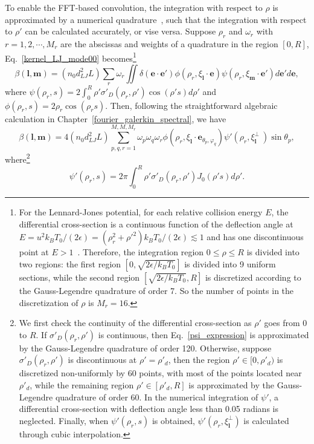 To enable the FFT-based convolution, the integration with respect to $\rho$ is approximated by a numerical quadrature~\cite{Hu2012,wuPoF2015}, such that the integration with respect to $\rho'$ can be calculated accurately, or vise versa. Suppose $\rho_r$ and $\omega_r$ with $r=1,2,\cdots,M_r$ are the abscissas and weights of a quadrature in the region $[0,R]$, Eq.~\eqref{kernel_LJ_mode00} becomes\footnote{For the Lennard-Jones potential, for each relative collision energy $E$, the differential cross-section is a continuous function of the deflection angle at $E=u^2k_BT_0/(2\epsilon)=(\rho_r^2+\rho'^2)k_BT_0/(2\epsilon)\lesssim1$ and has one discontinuous point at $E>1$~\cite{Sharipov_trans}. Therefore, the integration region $0\le\rho\le{}R$ is divided into two regions: the first region $[0,\sqrt{2\epsilon/k_BT_0}]$ is divided into 9 uniform sections, while the second region $[\sqrt{2\epsilon/k_BT_0},R]$ is discretized according to the Gauss-Legendre quadrature of order 7. So the number of points in the discretization of  $\rho$ is $M_r=16$.} 
\begin{equation}
\beta(\bm{l},\bm{m})=(n_0d_{LJ}^2L)\sum_{r}\omega_r\iint  \delta(\bm{e}\cdot{\bm{e}'})\phi(\rho_r,\xi_{\bm{l}}\cdot{\bm{e}})\psi(\rho_r,\xi_{\bm{m}}\cdot{\bm{e}'})d\bm{e}'d\bm{e},
\end{equation} 
where $\psi(\rho_r,s)=2\int_0^R \rho'\sigma'_D(\rho_r,\rho')\cos(\rho's) d\rho'$ and $\phi(\rho_r,s)=2\rho_r\cos(\rho_rs)$. Then, following the straightforward algebraic calculation in Chapter~\ref{fourier_galerkin_spectral}, we have
\begin{equation} \label{kernel_modee}
\beta(\bm{l},\bm{m})= 4(n_0d_{LJ}^2L)\sum_{p,q,r=1}^{M,M,M_r}{\omega_p\omega_q\omega_r}
\phi(\rho_r,\xi_{\bm{l}}\cdot{\bm{e}_{\theta_p,\varphi_q}}) 
\psi'\left(\rho_r,\xi^\perp_{\bm{l}}\
\right) \sin\theta_p,
\end{equation}
where\footnote{We first check the continuity of the differential cross-section as $\rho'$ goes from 0 to $R$. If $\sigma'_D(\rho_r,\rho')$ is continuous, then Eq.~\eqref{psi_expression} is approximated by the Gauss-Legendre quadrature of order 120. Otherwise, suppose $\sigma'_D(\rho_r,\rho')$ is discontinuous at $\rho'=\rho'_d$, then the region $\rho'\in[0,\rho'_d)$ is discretized non-uniformly by 60 points, with most of the points located near $\rho'_d$, while the remaining region $\rho'\in[\rho'_d,R]$ is approximated by the Gauss-Legendre quadrature of order 60. In the numerical integration of $\psi'$, a differential cross-section with deflection angle less than 0.05 radians is neglected. Finally, when $\psi'\left(\rho_r,s\right)$ is obtained, $\psi'\left(\rho_r,\xi^\perp_{\bm{l}}\right)$ is calculated through cubic interpolation. } 
\begin{equation}\label{psi_expression}
\psi'(\rho_r,s)=2\pi\int_0^R \rho'\sigma'_D(\rho_r,\rho')J_0(\rho' s)d\rho'.
\end{equation}

